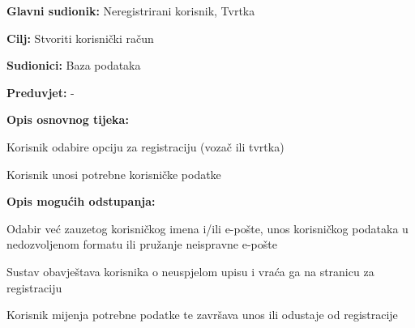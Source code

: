 					\begin{packed_item}
						
						\item  \textbf{Glavni sudionik: } Neregistrirani korisnik, Tvrtka
						\item  \textbf{Cilj:} Stvoriti korisnički račun
						\item  \textbf{Sudionici:} Baza podataka
						\item  \textbf{Preduvjet:} -
						\item  \textbf{Opis osnovnog tijeka:}
						
						\item[] \begin{packed_enum}
							\item Korisnik odabire opciju za registraciju (vozač ili tvrtka)
							\item Korisnik unosi potrebne korisničke podatke
						\end{packed_enum}
						
						\item  \textbf{Opis mogućih odstupanja:}
						
						\item[] \begin{packed_item}
							
							\item[2.a]  Odabir već zauzetog korisničkog imena i/ili e-pošte, unos korisničkog podataka u nedozvoljenom formatu ili pružanje neispravne e-pošte
							\item[] \begin{packed_enum}
								
								\item Sustav obavještava korisnika o neuspjelom upisu i vraća ga na stranicu za registraciju
								\item Korisnik mijenja potrebne podatke te završava unos ili odustaje od registracije
								
							\end{packed_enum}
						\end{packed_item}
					\end{packed_item}
					\noindent {}
